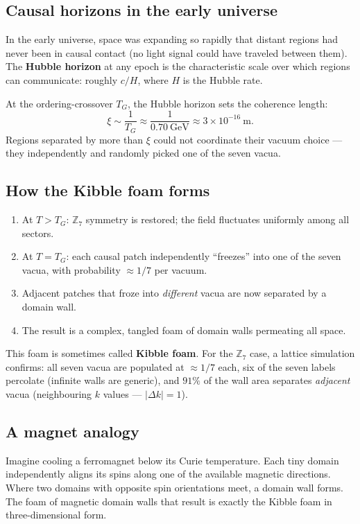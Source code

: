\documentclass[11pt,a4paper]{article}
\newcommand{\term}[1]{\textbf{#1}}
\newcommand{\ZS}{\mathbb{Z}_7}
\begin{document}
\subsection{Causal horizons in the early universe}

In the early universe, space was expanding so rapidly that distant regions had
never been in causal contact (no light signal could have traveled between them).
The \term{Hubble horizon} at any epoch is the characteristic scale over which
regions can communicate: roughly $c/H$, where $H$ is the Hubble rate.

At the ordering-crossover $T_G$, the Hubble horizon sets the coherence length:
\[
  \xi \sim \frac{1}{T_G} \approx \frac{1}{0.70~\text{GeV}}
  \approx 3\times10^{-16}~\text{m}.
\]
Regions separated by more than $\xi$ could not coordinate their vacuum
choice --- they independently and randomly picked one of the seven vacua.

\subsection{How the Kibble foam forms}

\begin{enumerate}
\item At $T > T_G$: $\ZS$ symmetry is restored; the field fluctuates
      uniformly among all sectors.
\item At $T = T_G$: each causal patch independently ``freezes'' into one
      of the seven vacua, with probability $\approx 1/7$ per vacuum.
\item Adjacent patches that froze into \emph{different} vacua are now
      separated by a domain wall.
\item The result is a complex, tangled foam of domain walls permeating
      all space.
\end{enumerate}

This foam is sometimes called \term{Kibble foam}.
For the $\ZS$ case, a lattice simulation confirms:
all seven vacua are populated at $\approx 1/7$ each,
six of the seven labels percolate (infinite walls are generic),
and $91\%$ of the wall area separates \emph{adjacent} vacua
(neighbouring $k$ values --- $|\Delta k| = 1$).

\subsection{A magnet analogy}

Imagine cooling a ferromagnet below its Curie temperature.
Each tiny domain independently aligns its spins along one of the available
magnetic directions.
Where two domains with opposite spin orientations meet, a domain wall forms.
The foam of magnetic domain walls that result is exactly the Kibble foam
in three-dimensional form.
\end{document}
